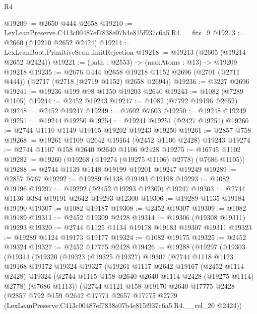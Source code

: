 \begin{lexlean}{R4}
\begin{coremodule}
@19209 := @2650 @444 @2658
@19210 := LexLeanPreserve.C413c00487ef7838e07b4e815f937c6a5.R4.__fits_9
@19213 := @2660 (@19210 @2652 @2424)
@19214 := LexLeanBoot.PrimitiveScan.limitRejection
@19218 := @19213 (@2605 (@19214 @2652 @2424))
@19221 := (path : @2553) -> (maxAtoms : @13) -> @19209 @19218
@19235 := @2676
    @444
    @2658
    @19218
    @1152
    @2696
    (@2701 (@2711 @444))
    (@2717 (@2718 (@2719 @1152) @2658 @2694))
@19236 := @3227 @2696
@19241 := @19236 @199 @98 @1150 @19203 @2640
@19243 := @1082 (@7289 @1105)
@19244 := @2452 @19243
@19247 := @1082 (@7792 @19196 @2652)
@19248 := @2452 @19247
@19249 := @7602 @7603
@19250 := @19248 @19249
@19251 := @19244 @19250
@19254 := @19241 @19251 (@2427 @19251)
@19260 := @2744 @1110 @1149 @19165 @19202 @19243 @19250
@19261 := @2857 @758
@19268 := @19261 @1109 @2642 @19164 (@2452 @1106 @2428) @19243
@19274 := @2744 @1107 @158 @2640 @2640 @1106 @2428
@19275 := @16745 @1102
@19282 := @19260 (@19268 (@19274 (@19275 @1106) @2778) (@7686 @1105))
@19288 := @2744 @1139 @1148 @19199 @19201 @19247 @19249
@19289 := @2857 @767
@19292 := @19289 @1138 @19193 @19198
@19293 := @1082 @19196
@19297 := @19292 (@2452 @19293 @12300) @19247
@19303 := @2744 @1136 @384 @19191 @2642 @19293 @12300
@19306 := @19289 @1135 @19184 @19190
@19307 := @1082 @19187
@19308 := @2452 @19307
@19309 := @1082 @19189
@19311 := @2452 @19309 @2428
@19314 := @19306 (@19308 @19311) @19293
@19320 := @2744 @1125 @1134 @19178 @19183 @19307 @19311
@19323 := @19289 @1124 @19173 @19177
@19324 := @1082 @19175
@19325 := @2452 @19324
@19327 := @2452 @17775 @2428
@19426 := @19288
    (@19297
      (@19303
        (@19314
          (@19320
            (@19323
              (@19325 @19327)
              @19307
              (@2744
                @1118
                @1123
                @19168
                @19172
                @19324
                @19327
                (@19261
                  @1117
                  @2642
                  @19167
                  (@2452 @1114 @2428)
                  @19324
                  (@2744 @1115 @158 @2640 @2640 @1114 @2428 (@19275 @1114) @2778)
                  (@7686 @1113))
                (@2744
                  @1121
                  @158
                  @19170
                  @2640
                  @17775
                  @2428
                  (@2857
                    @792
                    @159
                    @2642
                    @17771
                    @2657
                    @17775
                    @2779
                    (LexLeanPreserve.C413c00487ef7838e07b4e815f937c6a5.R4.__rel_20 @2424))

\end{coremodule}
\end{lexlean}
